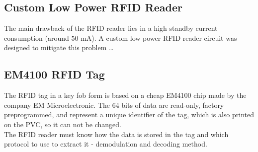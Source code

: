         
            
    \subsection{Custom Low Power RFID Reader}
        The main drawback of the RFID reader lies in a high standby current consumption (around 50 mA). A custom low power RFID reader circuit was designed to mitigate this problem \ldots
        
        
    \subsection{EM4100 RFID Tag}
        The RFID tag in a key fob form is based on a cheap EM4100 chip made by the company EM Microelectronic. 
        The 64 bits of data are read-only, factory preprogrammed,  and represent a unique identifier of the tag, which is also printed on the PVC, so it can not be changed. \\
        The RFID reader must know how the data is stored in the tag and which protocol to use to extract it - demodulation and decoding method.
        







